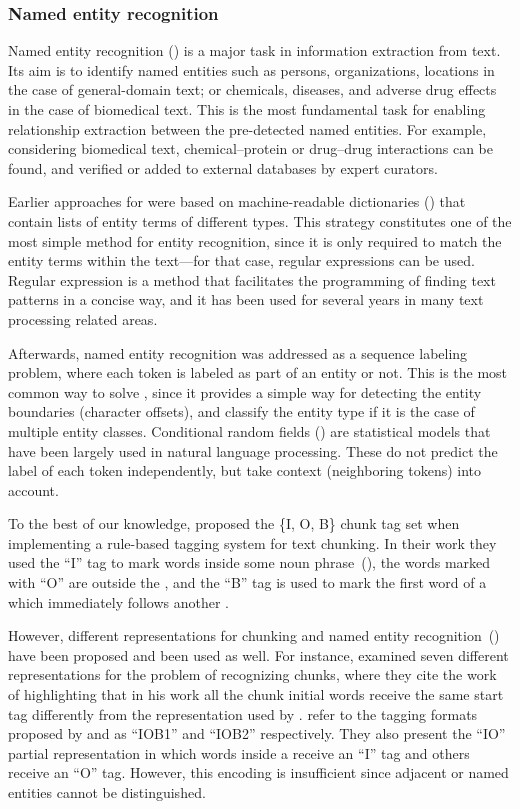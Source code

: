 \subsubsection{Named entity recognition}

Named entity recognition () is a major task in information extraction from text.
Its aim is to identify named entities such as persons, organizations, locations in the case of general-domain text; or chemicals, diseases, and adverse drug effects in the case of biomedical text.
This is the most fundamental task for enabling relationship extraction between the pre-detected named entities.
For example, considering biomedical text, chemical--protein or drug--drug interactions  can be found, and verified or added to external databases by expert curators.

Earlier approaches for  were based on machine-readable dictionaries () that contain lists of entity terms of different types.
This strategy constitutes one of the most simple method for entity recognition, since it is only required to match the entity terms within the text---for that case, regular expressions can be used.
Regular expression is a method that facilitates the programming of finding text patterns in a concise way, and it has been used for several years in many text processing related areas.

Afterwards, named entity recognition was addressed as a sequence labeling problem, where each token is labeled as part of an entity or not.
This is the most common way to solve , since it provides a simple way for detecting the entity boundaries (character offsets), and classify the entity type if it is the case of multiple entity classes.
Conditional random fields () are statistical models that have been largely used in natural language processing.
These do not predict the label of each token independently, but take context (neighboring tokens) into account.

To the best of our knowledge, \textcite{ramshaw1995a} proposed the \{I, O, B\} chunk tag set when implementing a rule-based tagging system for text chunking.
In their work they used the ``I'' tag to mark words inside some noun phrase~(), the words marked with ``O'' are outside the , and the ``B'' tag is used to mark the first word of a  which immediately follows another .

However, different representations for chunking and named entity recognition~() have been proposed and been used as well.
For instance, \textcite{sang1999a} examined seven different representations for the problem of recognizing  chunks, where they cite the work of \textcite{ratnaparkhi1998a} highlighting that in his work all the chunk initial words receive the same start tag differently from the representation used by \textcite{ramshaw1995a}.
\textcite{sang1999a} refer to the tagging formats proposed by \textcite{ramshaw1995a} and \textcite{ratnaparkhi1998a} as ``IOB1'' and ``IOB2'' respectively.
They also present the ``IO'' partial representation in which words inside a  receive an ``I'' tag and others receive an ``O'' tag.
However, this encoding is insufficient since adjacent  or named entities cannot be distinguished.

